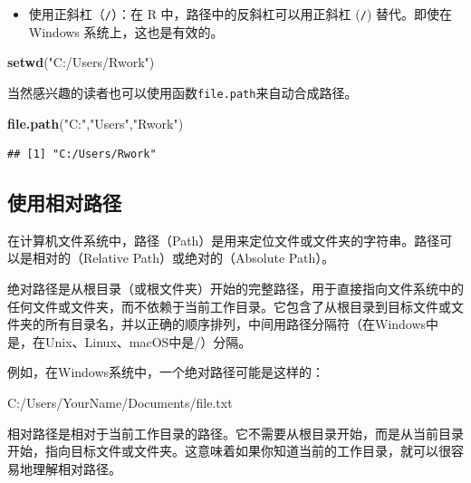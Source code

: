 \documentclass[
]{book}
\newenvironment{Shaded}{\begin{snugshade}}{\end{snugshade}}
\newcommand{\ExtensionTok}[1]{#1}
\newcommand{\FunctionTok}[1]{\textcolor[rgb]{0.13,0.29,0.53}{\textbf{#1}}}
\newcommand{\NormalTok}[1]{#1}
\newcommand{\StringTok}[1]{\textcolor[rgb]{0.31,0.60,0.02}{#1}}
\providecommand{\tightlist}{%
  \setlength{\itemsep}{0pt}\setlength{\parskip}{0pt}}
\begin{document}
\begin{itemize}
\tightlist
\item
  使用正斜杠（\texttt{/}）：在 R 中，路径中的反斜杠可以用正斜杠 (\texttt{/}) 替代。即使在 Windows 系统上，这也是有效的。
\end{itemize}

\begin{Shaded}
\begin{Highlighting}[]
\FunctionTok{setwd}\NormalTok{(}\StringTok{"C:/Users/Rwork"}\NormalTok{)}
\end{Highlighting}
\end{Shaded}

当然感兴趣的读者也可以使用函数\texttt{file.path}来自动合成路径。

\begin{Shaded}
\begin{Highlighting}[]
\FunctionTok{file.path}\NormalTok{(}\StringTok{"C:"}\NormalTok{,}\StringTok{"Users"}\NormalTok{,}\StringTok{"Rwork"}\NormalTok{)}
\end{Highlighting}
\end{Shaded}

\begin{verbatim}
## [1] "C:/Users/Rwork"
\end{verbatim}

\subsection{使用相对路径}\label{ux4f7fux7528ux76f8ux5bf9ux8defux5f84}

在计算机文件系统中，路径（Path）是用来定位文件或文件夹的字符串。路径可以是相对的（Relative Path）或绝对的（Absolute Path）。

绝对路径是从根目录（或根文件夹）开始的完整路径，用于直接指向文件系统中的任何文件或文件夹，而不依赖于当前工作目录。它包含了从根目录到目标文件或文件夹的所有目录名，并以正确的顺序排列，中间用路径分隔符（在Windows中是，在Unix、Linux、macOS中是/）分隔。

例如，在Windows系统中，一个绝对路径可能是这样的：

\begin{Shaded}
\begin{Highlighting}[]
\ExtensionTok{C:/Users/YourName/Documents/file.txt}
\end{Highlighting}
\end{Shaded}

相对路径是相对于当前工作目录的路径。它不需要从根目录开始，而是从当前目录开始，指向目标文件或文件夹。这意味着如果你知道当前的工作目录，就可以很容易地理解相对路径。
\end{document}
